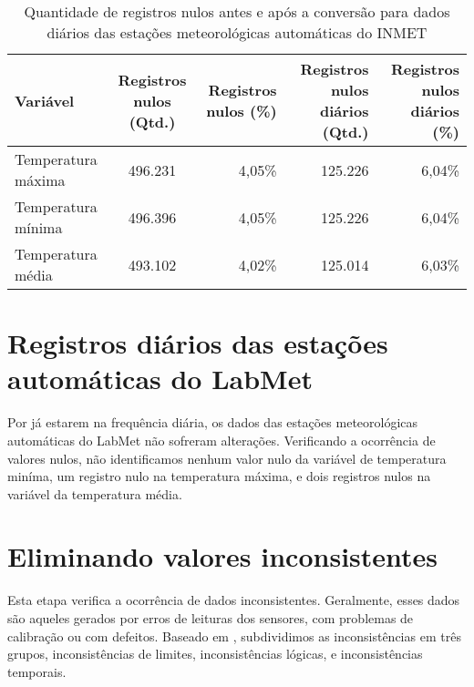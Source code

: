 \begin{table}[H]
\caption{Quantidade de registros nulos antes e após a conversão para dados diários das estações meteorológicas automáticas do INMET}
\label{tab:estacoes_convencionais_inmet_dados_nulos}
\begin{adjustbox}{width=\textwidth}
\begin{tabular}{|l|c|r|r|r|}
\hline
\textbf{Variável} & \textbf{Registros nulos (Qtd.)} & \textbf{Registros nulos (\%)} & \textbf{Registros nulos diários (Qtd.)} & \textbf{Registros nulos diários (\%)} \\
\hline
Temperatura máxima  & 496.231 & 4,05\% &125.226 & 6,04\% \\
\hline
Temperatura mínima & 496.396 & 4,05\% & 125.226 & 6,04\% \\
\hline
Temperatura média & 493.102 & 4,02\% & 125.014 & 6,03\% \\
\hline
\end{tabular}
\end{adjustbox}
\end{table}

\section{Registros diários das estações automáticas do LabMet}

Por já estarem na frequência diária, os dados das estações meteorológicas automáticas do LabMet não sofreram alterações. Verificando a ocorrência de valores nulos, não identificamos nenhum valor nulo da variável de temperatura miníma, um registro nulo na temperatura máxima, e dois registros nulos na variável da temperatura média. 

\section{Eliminando valores inconsistentes}

Esta etapa verifica a ocorrência de dados inconsistentes. Geralmente, esses dados são aqueles gerados por erros de leituras dos sensores, com problemas de calibração ou com defeitos. Baseado em , subdividimos as inconsistências em três grupos, inconsistências de limites, inconsistências lógicas, e inconsistências temporais. 


